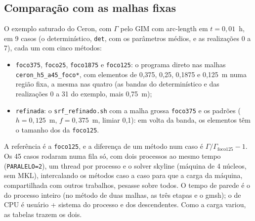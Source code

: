 \subsection{Comparação com as malhas fixas}\label{sec:ref:comparacao}

O exemplo saturado do Ceron, com $\Gamma$ pelo GIM com arc-length em $t = 0{,}01$~h, em 9 casos (o determinístico,
\texttt{det}, com os parâmetros médios, e as realizações 0 a 7), cada um com cinco métodos:
\begin{itemize}
\item \texttt{foco375}, \texttt{foco25}, \texttt{foco1875} e \texttt{foco125}: o programa direto nas malhas
  \texttt{ceron\_h5\_a45\_foco*}, com elementos de 0,375, 0,25, 0,1875 e 0,125~m numa região fixa, a mesma nas quatro
  (as bandas do determinístico e das realizações 0 a 31 do exemplo, mais 0,75~m);
\item \texttt{refinada}: o \texttt{srf\_refinado.sh} com a malha grossa \texttt{foco375} e os padrões ($h = 0{,}125$~m,
  $f = 0{,}375$~m, limiar 0,1): em volta da banda, os elementos têm o tamanho dos da \texttt{foco125}.
\end{itemize}
A referência é a \texttt{foco125}, e a diferença de um método num caso é $\Gamma/\Gamma_{\mathrm{foco125}} - 1$. Os 45
casos rodaram numa fila só, com dois processos ao mesmo tempo (\texttt{PARALELO=2}), um thread por processo e o solver
skyline (máquina de 4 núcleos, sem MKL), intercalando os métodos caso a caso para que a carga da máquina, compartilhada
com outros trabalhos, pesasse sobre todos. O tempo de parede é o do processo inteiro (no método de duas malhas, as três
etapas e o gmsh); o de CPU é usuário + sistema do processo e dos descendentes. Como a carga variou, as tabelas trazem os
dois.


\begin{table}[htbp]
  \centering\small\setlength{\tabcolsep}{3.5pt}
  \caption{Comparação por método, nos 9 casos (det e realizações 0 a 7): triângulos e equações (na \texttt{refinada},
    médias das malhas refinadas, de 1799 a 2624 triângulos), a diferença $\Gamma/\Gamma_{\mathrm{foco125}} - 1$ em valor
    absoluto (média e máximo) e com sinal (média), os tempos médios por caso e a razão deles para os da
    \texttt{foco125}. O tempo da \texttt{refinada} inclui a malha grossa e o gmsh.}
  \label{tab:ref:comparacao}
  
\end{table}

